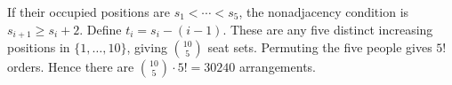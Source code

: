 If their occupied positions are $s_1<\cdots<s_5$, the nonadjacency condition is $s_{i+1}\ge s_i+2$. Define $t_i=s_i-(i-1)$. These are any five distinct increasing positions in $\{1,\ldots,10\}$, giving $\binom{10}5$ seat sets. Permuting the five people gives $5!$ orders. Hence there are $\binom{10}5\cdot5!=\boxed{30240}$ arrangements.
